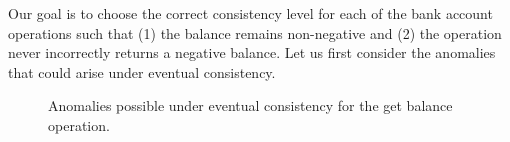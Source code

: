 Our goal is to choose the correct consistency level for each of the bank
account operations such that (1) the balance remains non-negative and (2) the
 operation never incorrectly returns a negative balance. Let us
first consider the anomalies that could arise under eventual consistency.

\begin{figure}[t]
\centering
{}
\hfill
{}
\hfill
{}
\caption{Anomalies possible under eventual consistency for the get balance operation.}
\label{fig:ba_anomalies}
\end{figure}

